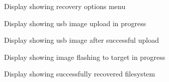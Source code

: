 \begin{figure}[ht]
	\centering
	\caption{Display showing recovery options menu}
	\label{fig:disp_menu}
\end{figure}

\begin{figure}[ht]
	\centering
	\caption{Display showing usb image upload in progress}
	\label{fig:disp_usbload}
\end{figure}

\begin{figure}[ht]
	\centering
	\caption{Display showing usb image after successful upload}
	\label{fig:disp_usbloaded}
\end{figure}

\begin{figure}[ht]
	\centering
	\caption{Display showing image flashing to target in progress}
	\label{fig:disp_flashwrite}
\end{figure}

\begin{figure}[ht]
	\centering
	\caption{Display showing successfully recovered filesystem}
	\label{fig:disp_fs_recovered}
\end{figure}


